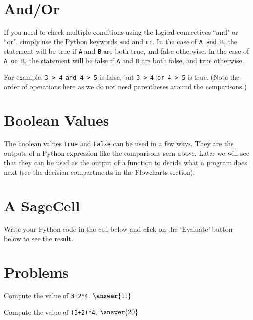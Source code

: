 \documentclass{ximera}
\begin{document}
\section{And/Or}

If you need to check multiple conditions using the logical connectives ``and" or ``or", simply use the Python keywords \verb|and| and \verb|or|. In the case of \verb|A and B|, the statement will be true if \verb|A| and \verb|B| are both true, and false otherwise. In the case of \verb|A or B|, the statement will be false if \verb|A| and \verb|B| are both false, and true otherwise.

For example, \verb|3 > 4 and 4 > 5| is false, but \verb|3 > 4 or 4 > 5| is true. (Note the order of operations here as we do not need parentheses around the comparisons.)

\section{Boolean Values}

The boolean values \verb|True| and \verb|False| can be used in a few ways. They are the outputs of a Python expression like the comparisons seen above. Later we will see that they can be used as the output of a function to decide what a program does next (see the decision compartments in the Flowcharts section).

\section{A SageCell}

Write your Python code in the cell below and click on the `Evaluate' button below to see the result.

\begin{sageCell}

\end{sageCell}

\section{Problems}

\begin{question}
	Compute the value of \verb|3+2*4|. $\answer{11}$
\end{question}

\begin{question}
	Compute the value of \verb|(3+2)*4|. $\answer{20}$
\end{question}
\end{document}
